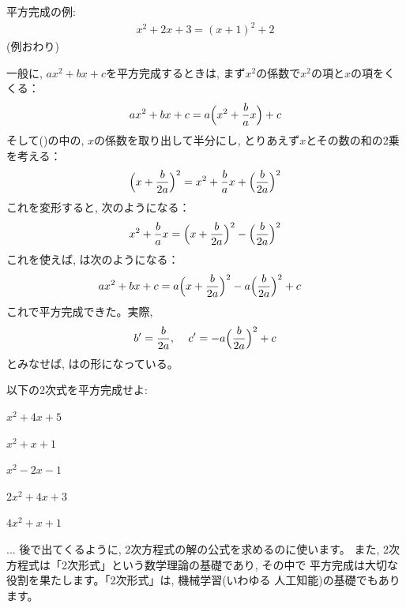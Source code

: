 \begin{exmpl} 平方完成の例:
\begin{eqnarray}
x^2+2x+3=(x+1)^2+2
\end{eqnarray}
(例おわり)\end{exmpl}\mv

一般に, $ax^2+bx+c$を平方完成するときは, まず$x^2$の係数で$x^2$の項と$x$の項をくくる：
\begin{eqnarray}
ax^2+bx+c=a\Bigl(x^2+\frac{b}{a}x\Bigr)+c\label{heihok}
\end{eqnarray}
そして()の中の, $x$の係数を取り出して半分にし, とりあえず$x$とその数の和の2乗を考える：
\begin{eqnarray}
\Bigl(x+\frac{b}{2a}\Bigr)^2=x^2+\frac{b}{a}x+\Bigl(\frac{b}{2a}\Bigr)^2
\end{eqnarray}
これを変形すると, 次のようになる：
\begin{eqnarray}
x^2+\frac{b}{a}x=\Bigl(x+\frac{b}{2a}\Bigr)^2-\Bigl(\frac{b}{2a}\Bigr)^2
\end{eqnarray}
これを使えば, は次のようになる：
\begin{equation}
ax^2+bx+c=a\Bigl(x+\frac{b}{2a}\Bigr)^2-a\Bigl(\frac{b}{2a}\Bigr)^2+c\,\,\,\,\,\,\label{eq:heihok5}
\end{equation}
これで平方完成できた。実際, 
\begin{eqnarray*}
b'=\frac{b}{2a},\,\,\,\,\,\,\,c'=-a\Bigl(\frac{b}{2a}\Bigr)^2+c
\end{eqnarray*}
とみなせば, はの形になっている。
\mv

\begin{q}\label{q:alg_heihokansei0}
 以下の2次式を平方完成せよ:
\begin{edaenumerate}
\item $x^2+4x+5$
\item $x^2+x+1$
\item $x^2-2x-1$
\item $2x^2+4x+3$
\item $4x^2+x+1$
\end{edaenumerate}
\end{q}

\begin{faq}{\small{} ... 
後で出てくるように, 2次方程式の解の公式を求めるのに使います。
また, 2次方程式は「2次形式」という数学理論の基礎であり, その中で
平方完成は大切な役割を果たします。「2次形式」は, 機械学習(いわゆる
人工知能)の基礎でもあります。}\end{faq}
\hv


